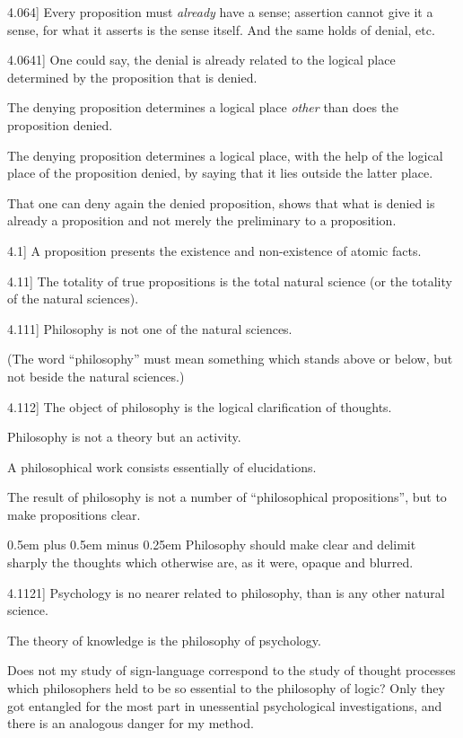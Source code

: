 \documentclass[12pt,oneside]{book}[2007/10/19]
\newcommand{\PropositionE}[2]{%
  \item[\phantomsection\label{PropE:#1}\PropGRef{#1}] #2%
}
\newcommand{\PropGRef}[1]{\hyperref[PropG:#1]{#1}}
\newcommand{\verystretchyspace}{\spaceskip0.5em plus 0.5em minus 0.25em}
\begin{document}
\begin{propositions}
\PropositionE{4.064}
{Every proposition must \emph{already} have a sense;
assertion cannot give it a sense, for what it asserts
is the sense itself. And the same holds of
denial, etc.}


\PropositionE{4.0641}
{One could say, the denial is already related to
the logical place determined by the proposition
that is denied.

The denying proposition determines a logical
place \emph{other} than does the proposition denied.

The denying proposition determines a logical
place, with the help of the logical place of the
proposition denied, by saying that it lies outside
the latter place.

That one can deny again the denied proposition,
shows that what is denied is already a proposition
and not merely the preliminary to a
proposition.}


\PropositionE{4.1}
{A proposition presents the existence and non-existence
of atomic facts.}


\PropositionE{4.11}
{The totality of true propositions is the total
natural science (or the totality of the natural
sciences).}


\PropositionE{4.111}
{Philosophy is not one of the natural
sciences.

(The word ``philosophy'' must mean something
which stands above or below, but not beside the
natural sciences.)}


\PropositionE{4.112}
{The object of philosophy is the logical clarification
of thoughts.

Philosophy is not a theory but an activity.

A philosophical work consists essentially of
elucidations.

The result of philosophy is not a number of
``philosophical propositions'', but to make propositions
clear.

{\verystretchyspace
Philosophy should make clear and delimit
sharply the thoughts which otherwise are, as it
were, opaque and blurred.}}


\PropositionE{4.1121}
{Psychology is no nearer related to philosophy,
than is any other natural science.

The theory of knowledge is the philosophy of
psychology.

Does not my study of sign-language correspond
to the study of thought processes which philosophers
held to be so essential to the philosophy of logic?
Only they got entangled for the most part in unessential
psychological investigations, and there
is an analogous danger for my method.}



\end{propositions}
\end{document}
